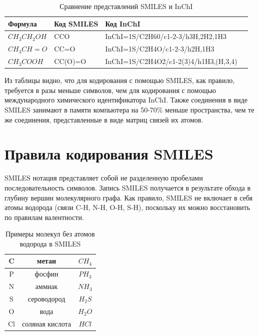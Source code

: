 \documentclass[a4paper,14pt]{extreport}
\begin{document}
\begin{table}[H]
\begin{center}
\begin{tabular}{|l|l|l|l|}
\hline
	Формула & Код SMILES & Код InChI\\
\hline
	$CH_3CH_2OH$ & CCO & InChI=1S/C2H60/c1-2-3/h3H,2H2,1H3\\
\hline
	$CH_3CH=O$ & CC=O & InChI=1S/C2H4O/c1-2-3/h2H,1H3\\
\hline
	$CH_3COOH$ & CC(O)=O & InChI=1S/C2H4O2/c1-2(3)4/h1H3,(H,3,4)\\
\hline
\end{tabular}
\caption{Сравнение представлений SMILES и InChI}
\end{center}
\end{table}


Из таблицы видно, что для кодирования с помощью SMILES, как правило, требуется в разы меньше символов, чем для кодирования с помощью международного химического идентификатора InChI. Также соединения в виде SMILES занимают в памяти компьютера на 50-70\% меньше пространства, чем те же соединения, представленные в виде матриц связей их атомов.

  \section{Правила кодирования SMILES}
  \label{s:smiles_coding_sec}
  SMILES нотация представляет собой не разделенную пробелами последовательность символов. Запись SMILES получается в результате обхода в глубину вершин молекулярного графа.
Как правило, SMILES не включает в себя атомы водорода (связи C-H, N-H, O-H, S-H), поскольку их можно восстановить по правилам валентности.
\newpage
\begin{table}[H]
\begin{center}
\begin{tabular}{|c|c|c|}
\hline
	C & метан & $CH_4$\\
\hline
	P & фосфин & $PH_3$\\
\hline
	N & аммиак & $NH_3$\\
\hline
	S & сероводород & $H_2S$\\
\hline
	O & вода & $H_2O$\\
\hline
	Cl & соляная кислота & $HCl$\\
\hline
\end{tabular}
\caption{Примеры молекул без атомов водорода в SMILES}
\end{center}
\end{table}
\end{document}
